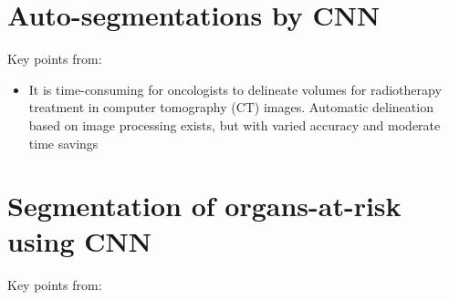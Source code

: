\documentclass[11pt]{article}
\begin{document}
\section{Auto-segmentations by CNN}

Key points from: \cite{Sartor2020-et}

\begin{itemize}
    \item It is time-consuming for oncologists to delineate volumes for radiotherapy treatment in
    computer tomography (CT) images. Automatic delineation based on image processing exists, but with
    varied accuracy and moderate time savings
\end{itemize}

\section{Segmentation of organs-at-risk using CNN}

Key points from: \cite{LIU2020184}
\end{document}
